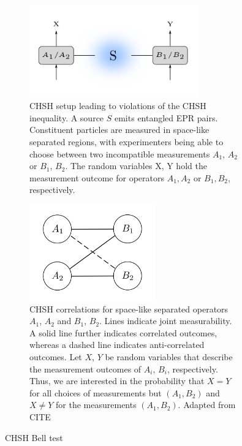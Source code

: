 \begin{figure}
\centering
\begin{subfigure}{\textwidth}
\centering
\includegraphics[width=0.8\textwidth]{images/bell.png}
\caption{CHSH setup leading to violations of the CHSH inequality. A source $S$ emits entangled EPR pairs. Constituent particles are measured in space-like separated regions, with experimenters being able to choose between two incompatible measurements $A_1$, $A_2$ or $B_1$, $B_2$. The random variables X, Y hold the measurement outcome for operators $A_1, A_2$ or $B_1, B_2$, respectively.}
\label{fig:bell}
\end{subfigure}
\vspace{2ex}
\begin{subfigure}{\textwidth}
\centering
\includegraphics[width=0.6\textwidth]{images/chsh.png}
\caption{CHSH correlations for space-like separated operators $A_1$, $A_2$ and $B_1$, $B_2$. Lines indicate joint measurability. A solid line further indicates correlated outcomes, whereas a dashed line indicates anti-correlated outcomes. Let $X$, $Y$ be random variables that describe the measurement outcomes of $A_i$, $B_i$, respectively. Thus, we are interested in the probability that $X=Y$ for all choices of measurements but $(A_1,B_2)$ and $X\neq Y$ for the measurements $(A_1,B_2)$. Adapted from CITE}
\label{fig:chsh}
\end{subfigure}
\caption{CHSH Bell test}
\label{fig:chshbelltest}
\end{figure}

